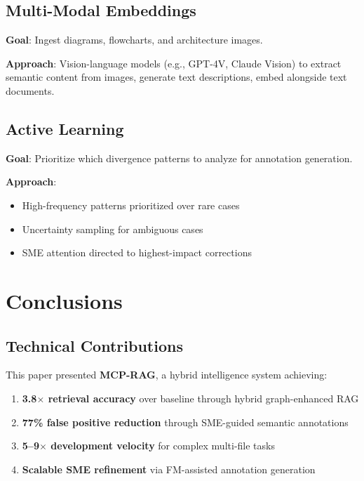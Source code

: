 \documentclass[11pt,letterpaper]{article}
\begin{document}
\subsection{Multi-Modal Embeddings}

\textbf{Goal}: Ingest diagrams, flowcharts, and architecture images.

\textbf{Approach}: Vision-language models (e.g., GPT-4V, Claude Vision) to extract semantic content from images, generate text descriptions, embed alongside text documents.

\subsection{Active Learning}

\textbf{Goal}: Prioritize which divergence patterns to analyze for annotation generation.

\textbf{Approach}:
\begin{itemize}
    \item High-frequency patterns prioritized over rare cases
    \item Uncertainty sampling for ambiguous cases
    \item SME attention directed to highest-impact corrections
\end{itemize}

\section{Conclusions}

\subsection{Technical Contributions}

This paper presented \textbf{MCP-RAG}, a hybrid intelligence system achieving:

\begin{enumerate}
    \item \textbf{3.8$\times$ retrieval accuracy} over baseline through hybrid graph-enhanced RAG
    \item \textbf{77\% false positive reduction} through SME-guided semantic annotations
    \item \textbf{5--9$\times$ development velocity} for complex multi-file tasks
    \item \textbf{Scalable SME refinement} via FM-assisted annotation generation
\end{enumerate}
\end{document}
